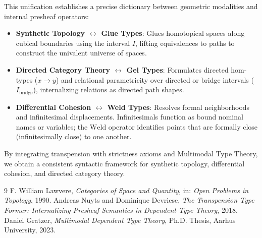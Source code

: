 \documentclass{article}
\begin{document}
This unification establishes a precise dictionary between geometric modalities and internal presheaf operators:
\begin{itemize}
  \item \textbf{Synthetic Topology $\longleftrightarrow$ Glue Types}: Glues homotopical spaces along cubical boundaries using the interval $I$, lifting equivalences to paths to construct the univalent universe of spaces.
  \item \textbf{Directed Category Theory $\longleftrightarrow$ Gel Types}: Formulates directed hom-types ($x \to y$) and relational parametricity over directed or bridge intervals ($I_{\mathrm{bridge}}$), internalizing relations as directed path shapes.
  \item \textbf{Differential Cohesion $\longleftrightarrow$ Weld Types}: Resolves formal neighborhoods and infinitesimal displacements. Infinitesimals function as bound nominal names or variables; the $\mathrm{Weld}$ operator identifies points that are formally close (infinitesimally close) to one another.
\end{itemize}

By integrating transpension with strictness axioms and Multimodal Type Theory, we obtain a consistent syntactic framework for synthetic topology, differential cohesion, and directed category theory.

\begin{thebibliography}{9}
 F. William Lawvere, \emph{Categories of Space and Quantity}, in: \emph{Open Problems in Topology}, 1990.
 Andreas Nuyts and Dominique Devriese, \emph{The Transpension Type Former: Internalizing Presheaf Semantics in Dependent Type Theory}, 2018.
 Daniel Gratzer, \emph{Multimodal Dependent Type Theory}, Ph.D. Thesis, Aarhus University, 2023.
\end{thebibliography}
\end{document}
